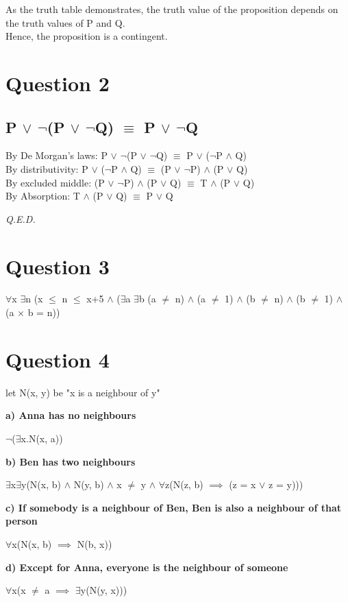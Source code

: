 \documentclass[a4paper]{article}
\begin{document}
As the truth table demonstrates, the truth value of the proposition depends on
the truth values of P and Q.\\
Hence, the proposition is a contingent.


\section*{Question 2}
\subsection*{P $\lor$ $\neg$(P $\lor$ $\neg$Q) $\equiv$ P $\lor$ $\neg$Q}
By De Morgan's laws: P $\lor$ $\neg$(P $\lor$ $\neg$Q) $\equiv$ P $\lor$ ($\neg$P $\land$ Q)\\
By distributivity:\;\;\;\;\;\;\; P $\lor$ ($\neg$P $\land$ Q) $\equiv$ (P $\lor$ $\neg$P) $\land$ (P $\lor$ Q)\\
By excluded middle:\;\; (P $\lor$ $\neg$P) $\land$ (P $\lor$ Q) $\equiv$ T $\land$ (P $\lor$ Q)\\
By Absorption:\;\;\;\;\;\;\;\;\;\; T $\land$ (P $\lor$ Q) $\equiv$ P $\lor$ Q

\vspace{10pt}

\emph{Q.E.D.}

\section*{Question 3}
$\forall$x $\exists$n (x $\le$ n $\leq$ x+5 $\land$
($\exists$a $\exists$b (a $\neq$ n) $\land$ (a $\neq$ 1) $\land$ (b $\neq$ n) $\land$ (b $\neq$ 1)
$\land$ (a $\times$ b = n))

\section*{Question 4}
\par\noindent\parskip 8pt
let N(x, y) be "x is a neighbour of y"

\par\noindent\parskip 2pt
\textbf{a) Anna has no neighbours}
\par\parskip 2pt
$\neg$($\exists$x.N(x, a))

\par\noindent\parskip 2pt
\textbf{b) Ben has two neighbours}
\par\parskip 2pt
$\exists$x$\exists$y(N(x, b) $\land$ N(y, b) $\land$ x $\neq$ y $\land$
$\forall$z(N(z, b) $\implies$ (z = x $\lor$ z = y)))

\pagebreak
\par\noindent\parskip 2pt
\textbf{c) If somebody is a neighbour of Ben, Ben is also a neighbour of that person}
\par\parskip 2pt
$\forall$x(N(x, b) $\implies$ N(b, x))

\par\noindent\parskip 2pt
\textbf{d) Except for Anna, everyone is the neighbour of someone}
\par\parskip 2pt
$\forall$x(x $\neq$ a $\implies$ $\exists$y(N(y, x)))
\end{document}
